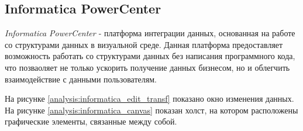 \newpage

\subsection{Informatica PowerCenter}

\textit{Informatica PowerCenter \cite{bib3}} - платформа интеграции данных, основанная на 
работе со структурами данных в визуальной среде. 
Данная платформа предоставляет возможность работать со структурами данных 
без написания программного кода, что позваоляет не только ускорить получение данных бизнесом,
но и облегчить взаимодействие с данными пользователям. 

На рисунке \ref{analysis:informatica_edit_transf} показано окно изменения данных. 
На рисунке \ref{analysis:informatica_canvas} показан холст, на котором расположены графические 
элементы, связанные между собой. 

\begin{figure}[ht!]
\end{figure}

\begin{figure}[ht!]
\end{figure}

